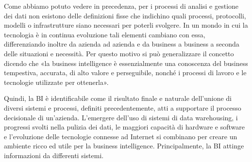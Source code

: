 Come abbiamo potuto vedere in precedenza, per i processi di analisi e gestione dei dati non esistono delle definizioni fisse che indichino quali processi, protocolli, modelli o infrastrutture siano necessari per poterli svolgere. In un mondo in cui la tecnologia è in continua evoluzione tali elementi cambiano con essa, differenziando inoltre da azienda ad azienda e da business a business a seconda delle situazioni e necessità. Per questo motivo si può generalizzare il concetto dicendo che «la business intelligence è essenzialmente una conoscenza del business tempestiva, accurata, di alto valore e perseguibile, nonché i processi di lavoro e le tecnologie utilizzate per ottenerla».\cite{bi_for_dummies}

Quindi, la BI è identificabile come il risultato finale e naturale dell'unione di diversi sistemi e processi, definiti precedentemente, atti a supportare il processo decisionale di un'azienda. L'emergere dell'uso di sistemi di data warehousing, i progressi svolti nella pulizia dei dati, le maggiori capacità di hardware e software e l'evoluzione delle tecnologie connesse ad Internet si combinano per creare un ambiente ricco ed utile per la business intelligence. Principalmente, la BI attinge informazioni da differenti sistemi.\cite{researchgate_bi_systems}

